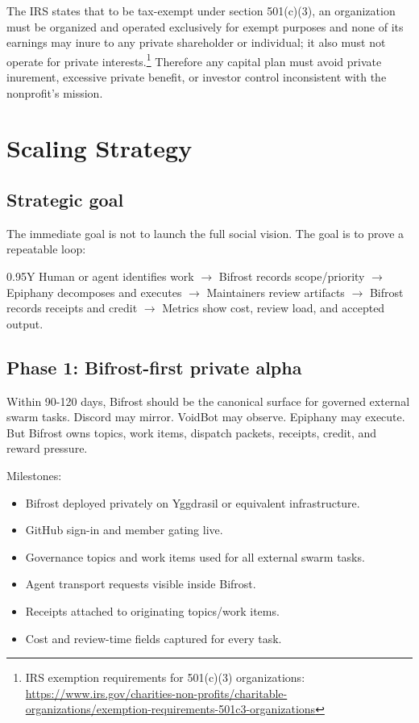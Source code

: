 \documentclass[11pt,oneside]{report}
\newcommand{\src}[2]{\footnote{#1: \url{#2}}}
\begin{document}
The IRS states that to be tax-exempt under section 501(c)(3), an organization must be organized and operated exclusively for exempt purposes and none of its earnings may inure to any private shareholder or individual; it also must not operate for private interests.\src{IRS exemption requirements for 501(c)(3) organizations}{https://www.irs.gov/charities-non-profits/charitable-organizations/exemption-requirements-501c3-organizations} Therefore any capital plan must avoid private inurement, excessive private benefit, or investor control inconsistent with the nonprofit's mission.

\chapter{Scaling Strategy}

\section{Strategic goal}

The immediate goal is not to launch the full social vision. The goal is to prove a repeatable loop:

\begin{center}
\begin{tabularx}{0.95\linewidth}{Y}
Human or agent identifies work $\rightarrow$ Bifrost records scope/priority $\rightarrow$ Epiphany decomposes and executes $\rightarrow$ Maintainers review artifacts $\rightarrow$ Bifrost records receipts and credit $\rightarrow$ Metrics show cost, review load, and accepted output.\\
\end{tabularx}
\end{center}

\section{Phase 1: Bifrost-first private alpha}

Within 90-120 days, Bifrost should be the canonical surface for governed external swarm tasks. Discord may mirror. VoidBot may observe. Epiphany may execute. But Bifrost owns topics, work items, dispatch packets, receipts, credit, and reward pressure.

Milestones:

\begin{itemize}
  \item Bifrost deployed privately on Yggdrasil or equivalent infrastructure.
  \item GitHub sign-in and member gating live.
  \item Governance topics and work items used for all external swarm tasks.
  \item Agent transport requests visible inside Bifrost.
  \item Receipts attached to originating topics/work items.
  \item Cost and review-time fields captured for every task.
\end{itemize}
\end{document}
